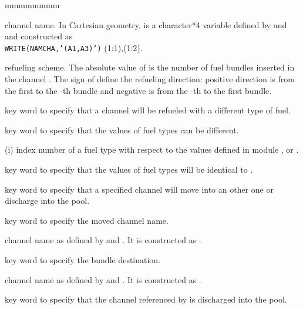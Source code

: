 \begin{ListeDeDescription}{mmmmmmmm}
\item[\dusa{NAMCHA}] channel name. In Cartesian geometry,  is a character*4 variable defined by  and
 and constructed as \\
{\tt WRITE(NAMCHA,'(A1,A3)')} (1:1),(1:2).

\item[\dusa{nsh}] refueling scheme. The absolute value of  is
the number of fuel bundles inserted in the channel .
The sign of  define the refueling direction: positive direction
is from the first to the -th bundle and negative is from the 
-th to the first bundle.

\item[\moc{NEWFUEL}] key word to specify that a channel will be refueled
with a different type of fuel.

\item[\moc{SOME}] key word to specify that the  values of
fuel types can be different.

\item[\dusa{imix}(i)] index number of a fuel type with respect to the
values defined in module ,  or .

\item[\moc{ALL}] key word to specify that the  values of
fuel types will be identical to .

\item[\moc{SHUFF}] key word to specify that a specified channel will
move into an other one or discharge into the pool.

\item[\moc{CHAN}] key word to specify the moved channel name.

\item[\dusa{NMCHA1}] channel name as defined by  and
. It is constructed as . 

\item[\moc{TO}] key word to specify the bundle destination.

\item[\dusa{NMCHA2}] channel name as defined by  and
. It is constructed as . 

\item[\moc{POOL}] key word to specify that the channel referenced by
 is discharged into the pool.

\end{ListeDeDescription}
\clearpage
